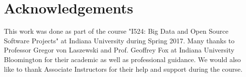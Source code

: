 \documentclass[9pt,twocolumn,twoside]{../../styles/osajnl}
\begin{document}
\section*{Acknowledgements}

This work was done as part of the course "I524: Big Data and Open
Source Software Projects" at Indiana University during Spring
2017. Many thanks to Professor Gregor von Laszewski and Prof. Geoffrey
Fox at Indiana University Bloomington for their academic as well as
professional guidance. We would also like to thank Associate
Instructors for their help and support during the course.


\end{document}
